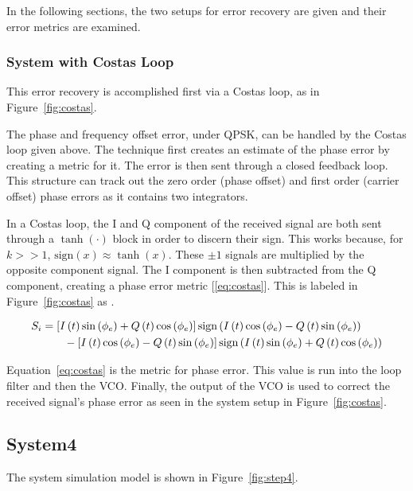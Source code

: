 \documentclass[]{article}
\newcommand{\rom}[1]{\uppercase\expandafter{\romannumeral#1}}
\begin{document}
In the following sections, the two setups for error recovery are given and their error metrics are examined.
\newpage

\subsubsection{System with Costas Loop}
This error recovery is accomplished first via a Costas loop, as in Figure~\ref{fig:costas}. 

The phase and frequency offset error, under QPSK, can be handled by the Costas loop given above. The technique first creates an estimate of the phase error by creating a metric for it.  The error is then sent through a closed feedback loop.  This structure can track out the zero order (phase offset) and first order (carrier offset) phase errors as it contains two integrators. 

In a Costas loop, the I and Q component of the received signal are both sent through a $\tanh\left(\cdot\right)$ block in order to discern their sign.  This works because, for $k>>1$, $\text{sign}\left(x\right) \approx \tanh \left(x\right)$.  These $\pm1$ signals are multiplied by the opposite component signal.  The I component is then subtracted from the Q component, creating a phase error metric [\ref{eq:costas}].  This is labeled in Figure~\ref{fig:costas} as \rom{1}. 

\begin{align}
  \label{eq:costas}
  S_{\rom{1}} &= \left[I\left(t\right)\sin\left(\phi_e\right)+Q\left(t\right)\cos\left(\phi_e\right)\right]\text{sign}\left(I\left(t\right)\cos\left(\phi_e\right)- Q\left(t\right)\sin\left(\phi_e\right)\right)\nonumber \\
  &\qquad {} - \left[I\left(t\right)\cos\left(\phi_e\right)-Q\left(t\right)\sin\left(\phi_e\right)\right]\text{sign}\left(I\left(t\right)\sin\left(\phi_e\right)+Q\left(t\right)\cos\left(\phi_e\right)\right)
  \end{align}


Equation~\ref{eq:costas} is the metric for phase error.  This value is run into the loop filter and then the VCO.  Finally, the output of the VCO is used to correct the received signal's phase error as seen in the system setup in Figure~\ref{fig:costas}.



\newpage
\subsection{System4}
\label{sec:system4}
The system simulation model is shown in Figure~\ref{fig:step4}.  
\end{document}
